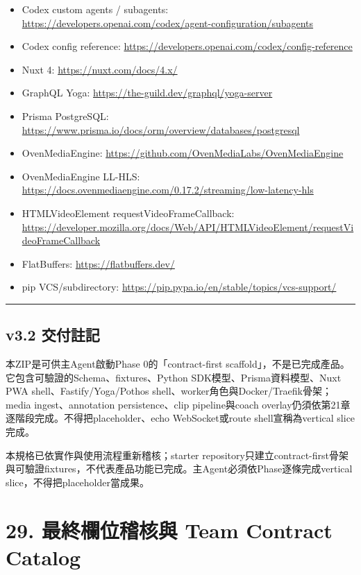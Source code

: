 \documentclass[
  9pt,
  a4paper,
]{article}
\providecommand{\tightlist}{%
  \setlength{\itemsep}{0pt}\setlength{\parskip}{0pt}}
\begin{document}
\begin{itemize}
\tightlist
\item
  Codex custom agents / subagents:
  \url{https://developers.openai.com/codex/agent-configuration/subagents}
\item
  Codex config reference:
  \url{https://developers.openai.com/codex/config-reference}
\item
  Nuxt 4: \url{https://nuxt.com/docs/4.x/}
\item
  GraphQL Yoga: \url{https://the-guild.dev/graphql/yoga-server}
\item
  Prisma PostgreSQL:
  \url{https://www.prisma.io/docs/orm/overview/databases/postgresql}
\item
  OvenMediaEngine: \url{https://github.com/OvenMediaLabs/OvenMediaEngine}
\item
  OvenMediaEngine LL-HLS: \url{https://docs.ovenmediaengine.com/0.17.2/streaming/low-latency-hls}
\item
  HTMLVideoElement requestVideoFrameCallback:
  \url{https://developer.mozilla.org/docs/Web/API/HTMLVideoElement/requestVideoFrameCallback}
\item
  FlatBuffers: \url{https://flatbuffers.dev/}
\item
  pip VCS/subdirectory:
  \url{https://pip.pypa.io/en/stable/topics/vcs-support/}
\end{itemize}

\begin{center}\rule{0.5\linewidth}{0.5pt}\end{center}

\subsection{v3.2 交付註記}\label{v32-ux4ea4ux4ed8ux8a3bux8a18}

本ZIP是可供主Agent啟動Phase 0的「contract-first
scaffold」，不是已完成產品。它包含可驗證的Schema、fixtures、Python
SDK模型、Prisma資料模型、Nuxt PWA shell、Fastify/Yoga/Pothos
shell、worker角色與Docker/Traefik骨架；media ingest、annotation
persistence、clip pipeline與coach
overlay仍須依第21章逐階段完成。不得把placeholder、echo WebSocket或route
shell宣稱為vertical slice完成。

本規格已依實作與使用流程重新稽核；starter
repository只建立contract-first骨架與可驗證fixtures，不代表產品功能已完成。主Agent必須依Phase逐條完成vertical
slice，不得把placeholder當成果。

\section{29. 最終欄位稽核與 Team Contract
Catalog}\label{29-ux6700ux7d42ux6b04ux4f4dux7a3dux6838ux8207-team-contract-catalog}
\end{document}
